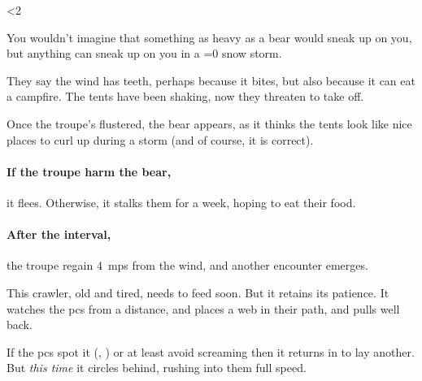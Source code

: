 \ifnum\value{temperature}<2

\bear

You wouldn't imagine that something as heavy as a bear would sneak up on you, but anything can sneak up on you in a
\ifnum\value{temperature}=0
  \gls{snow}
\fi
storm.

\begin{boxtext}
  They say the wind has teeth, perhaps because it bites, but also because it can eat a campfire.
  The tents have been shaking, now they threaten to take off.
\end{boxtext}

Once the troupe's flustered, the bear appears, as it thinks the tents look like nice places to curl up during a storm (and of course, it is correct).

\paragraph{If the troupe harm the bear,}
it flees.
Otherwise, it stalks them for a week, hoping to eat their food.

\paragraph{After the \gls{interval},}
the troupe regain 4~\glspl{mp} from the wind, and another encounter emerges.

\else

This \gls{crawler}, old and tired, needs to feed soon.
But it retains its patience.
It watches the \glspl{pc} from a distance, and places a web in their path, and pulls well back.

\chitincrawler

If the \glspl{pc} spot it (, \tn[10]) or at least avoid screaming then it returns in  to lay another.
But \emph{this time} it circles behind, rushing into them full speed.


\fi
